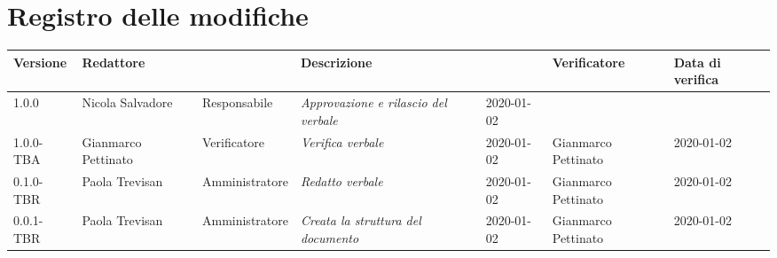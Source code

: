 \section*{Registro delle modifiche}
\renewcommand{\arraystretch}{1.8}

  \setlength\LTleft{-1.7cm}
  \begin{longtable}{|p{1.7cm}|p{2cm}|p{2.5cm}|p{3cm}|p{1.7cm}|p{2cm}|p{2.3cm}|}
    \hline

    \rowcolor{header}
    \textbf{Versione} & \textbf{Redattore} & \centering{\textbf{Ruolo}} & \textbf{Descrizione} &      \centering{\textbf{Data}} & \textbf{Verificatore} & \textbf{Data di verifica} \\

    \hline
    1.0.0 & Nicola Salvadore & Responsabile & \small{\textit{Approvazione e rilascio del verbale}} & 2020-01-02 & &\\
    1.0.0-TBA & Gianmarco Pettinato & Verificatore & \small{\textit{Verifica verbale}} & 2020-01-02 & Gianmarco Pettinato & 2020-01-02\\
	0.1.0-TBR & Paola Trevisan & Amministratore & \small{\textit{Redatto verbale}} & 2020-01-02 & Gianmarco Pettinato & 2020-01-02\\
    0.0.1-TBR & Paola Trevisan & Amministratore & \small{\textit{Creata la struttura del documento}} & 2020-01-02 & Gianmarco Pettinato & 2020-01-02\\

    \hline
  \end{longtable}

